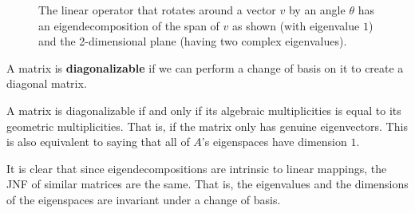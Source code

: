   \begin{example}
    \begin{figure}[H]
      \centering 
      \caption{The linear operator that rotates around a vector $v$ by an angle $\theta$ has an eigendecomposition of the span of $v$ as shown (with eigenvalue $1$) and the 2-dimensional plane (having two complex eigenvalues). } 
      \label{fig:rotation}
    \end{figure}
  \end{example}

  \begin{definition}
  A matrix is \textbf{diagonalizable} if we can perform a change of basis on it to create a diagonal matrix. 
  \end{definition}

  \begin{theorem}
  A matrix is diagonalizable if and only if its algebraic multiplicities is equal to its geometric multiplicities. That is, if the matrix only has genuine eigenvectors. This is also equivalent to saying that all of $A$'s eigenspaces have dimension $1$. 
  \end{theorem}

  It is clear that since eigendecompositions are intrinsic to linear mappings, the JNF of similar matrices are the same. That is, the eigenvalues and the dimensions of the eigenspaces are invariant under a change of basis. 

